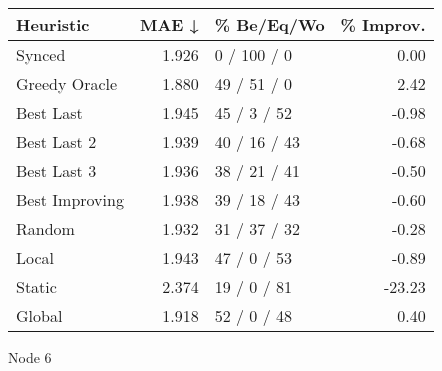 \begin{tabular}{lrlr}
\toprule
\textbf{Heuristic} & \textbf{MAE ↓} & \textbf{\% Be/Eq/Wo} & \textbf{\% Improv.} \\
\midrule
            Synced &          1.926 &          0 / 100 / 0 &                0.00 \\
     Greedy Oracle &          1.880 &          49 / 51 / 0 &                2.42 \\
         Best Last &          1.945 &          45 / 3 / 52 &               -0.98 \\
       Best Last 2 &          1.939 &         40 / 16 / 43 &               -0.68 \\
       Best Last 3 &          1.936 &         38 / 21 / 41 &               -0.50 \\
    Best Improving &          1.938 &         39 / 18 / 43 &               -0.60 \\
            Random &          1.932 &         31 / 37 / 32 &               -0.28 \\
             Local &          1.943 &          47 / 0 / 53 &               -0.89 \\
            Static &          2.374 &          19 / 0 / 81 &              -23.23 \\
            Global &          1.918 &          52 / 0 / 48 &                0.40 \\
\bottomrule
\end{tabular}
\caption{Node 6}
\label{tab:hr_non_lr01_le2_bs2_6}
